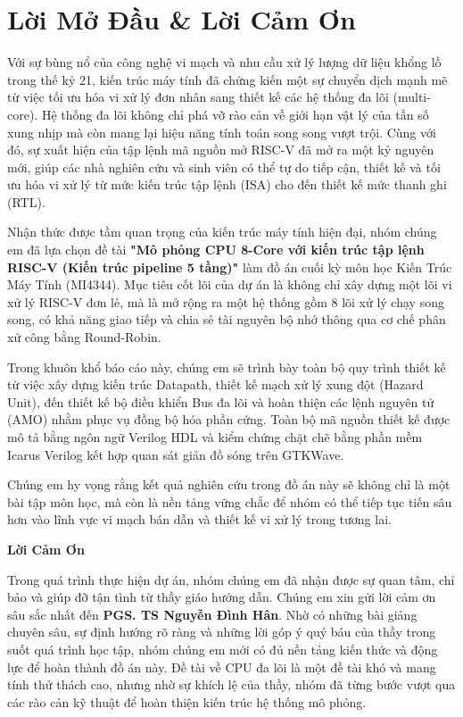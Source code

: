 \chapter*{Lời Mở Đầu \& Lời Cảm Ơn}

Với sự bùng nổ của công nghệ vi mạch và nhu cầu xử lý lượng dữ liệu khổng lồ trong thế kỷ 21, kiến trúc máy tính đã chứng kiến một sự chuyển dịch mạnh mẽ từ việc tối ưu hóa vi xử lý đơn nhân sang thiết kế các hệ thống đa lõi (multi-core). Hệ thống đa lõi không chỉ phá vỡ rào cản về giới hạn vật lý của tần số xung nhịp mà còn mang lại hiệu năng tính toán song song vượt trội. Cùng với đó, sự xuất hiện của tập lệnh mã nguồn mở RISC-V đã mở ra một kỷ nguyên mới, giúp các nhà nghiên cứu và sinh viên có thể tự do tiếp cận, thiết kế và tối ưu hóa vi xử lý từ mức kiến trúc tập lệnh (ISA) cho đến thiết kế mức thanh ghi (RTL).

Nhận thức được tầm quan trọng của kiến trúc máy tính hiện đại, nhóm chúng em đã lựa chọn đề tài \textbf{"Mô phỏng CPU 8-Core với kiến trúc tập lệnh RISC-V (Kiến trúc pipeline 5 tầng)"} làm đồ án cuối kỳ môn học Kiến Trúc Máy Tính (MI4344). Mục tiêu cốt lõi của dự án là không chỉ xây dựng một lõi vi xử lý RISC-V đơn lẻ, mà là mở rộng ra một hệ thống gồm 8 lõi xử lý chạy song song, có khả năng giao tiếp và chia sẻ tài nguyên bộ nhớ thông qua cơ chế phân xử công bằng Round-Robin.

Trong khuôn khổ báo cáo này, chúng em sẽ trình bày toàn bộ quy trình thiết kế từ việc xây dựng kiến trúc Datapath, thiết kế mạch xử lý xung đột (Hazard Unit), đến thiết kế bộ điều khiển Bus đa lõi và hoàn thiện các lệnh nguyên tử (AMO) nhằm phục vụ đồng bộ hóa phần cứng. Toàn bộ mã nguồn thiết kế được mô tả bằng ngôn ngữ Verilog HDL và kiểm chứng chặt chẽ bằng phần mềm Icarus Verilog kết hợp quan sát giản đồ sóng trên GTKWave.

Chúng em hy vọng rằng kết quả nghiên cứu trong đồ án này sẽ không chỉ là một bài tập môn học, mà còn là nền tảng vững chắc để nhóm có thể tiếp tục tiến sâu hơn vào lĩnh vực vi mạch bán dẫn và thiết kế vi xử lý trong tương lai.

\vspace{0.5cm}
\textbf{Lời Cảm Ơn}

Trong quá trình thực hiện dự án, nhóm chúng em đã nhận được sự quan tâm, chỉ bảo và giúp đỡ tận tình từ thầy giáo hướng dẫn. Chúng em xin gửi lời cảm ơn sâu sắc nhất đến \textbf{PGS. TS Nguyễn Đình Hân}. Nhờ có những bài giảng chuyên sâu, sự định hướng rõ ràng và những lời góp ý quý báu của thầy trong suốt quá trình học tập, nhóm chúng em mới có đủ nền tảng kiến thức và động lực để hoàn thành đồ án này. Đề tài về CPU đa lõi là một đề tài khó và mang tính thử thách cao, nhưng nhờ sự khích lệ của thầy, nhóm đã từng bước vượt qua các rào cản kỹ thuật để hoàn thiện kiến trúc hệ thống mô phỏng.

